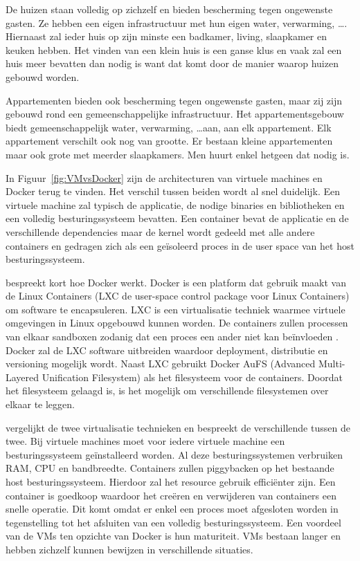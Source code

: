 De huizen staan volledig op zichzelf en bieden bescherming tegen ongewenste gasten.
Ze hebben een eigen infrastructuur met hun eigen water, verwarming, \ldots .
Hiernaast zal ieder huis op zijn minste een badkamer, living, slaapkamer en keuken hebben.
Het vinden van een klein huis is een ganse klus en vaak zal een huis meer bevatten dan nodig is want dat komt door de manier waarop huizen gebouwd worden.

Appartementen bieden ook bescherming tegen ongewenste gasten, maar zij zijn gebouwd rond een gemeenschappelijke infrastructuur.
Het appartementsgebouw biedt gemeenschappelijk water, verwarming, \ldots  aan, aan elk appartement.
Elk appartement verschilt ook nog van grootte.
Er bestaan kleine appartementen maar ook grote met meerder slaapkamers.
Men huurt enkel hetgeen dat nodig is.

In Figuur~\vref{fig:VMvsDocker} zijn de architecturen van virtuele machines en Docker terug te vinden.
Het verschil tussen beiden wordt al snel duidelijk.
Een virtuele machine zal typisch de applicatie, de nodige binaries en bibliotheken en een volledig besturingssysteem bevatten.
Een container bevat de applicatie en de verschillende dependencies maar de kernel wordt gedeeld met alle andere containers en gedragen zich als een geïsoleerd proces in de user space van het host besturingssysteem.

\citet{chamberlain2014using} bespreekt kort hoe Docker werkt.
Docker is een platform dat gebruik maakt van de Linux Containers (LXC de user-space control package voor Linux Containers) om software te encapsuleren.
LXC is een virtualisatie techniek waarmee virtuele omgevingen in Linux opgebouwd kunnen worden.
De containers zullen processen van elkaar sandboxen zodanig dat een proces een ander niet kan beïnvloeden \citep{merkel2014docker}.
Docker zal de LXC software uitbreiden waardoor deployment, distributie en versioning mogelijk wordt.
Naast LXC gebruikt Docker AuFS (Advanced Multi-Layered Unification Filesystem) als het filesysteem voor de containers.
Doordat het filesysteem gelaagd is, is het mogelijk om verschillende filesystemen over elkaar te leggen.

\citet{merkel2014docker} vergelijkt de twee virtualisatie technieken en bespreekt de verschillende tussen de twee.
Bij virtuele machines moet voor iedere virtuele machine een besturingssysteem geïnstalleerd worden.
Al deze besturingssystemen verbruiken RAM, CPU en bandbreedte.
Containers zullen piggybacken op het bestaande host besturingssysteem.
Hierdoor zal het resource gebruik efficiënter zijn.
Een container is goedkoop waardoor het creëren en verwijderen van containers een snelle operatie.
Dit komt omdat er enkel een proces moet afgesloten worden in tegenstelling tot het afsluiten van een volledig besturingssysteem.
Een voordeel van de VMs ten opzichte van Docker is hun maturiteit.
VMs bestaan langer en hebben zichzelf kunnen bewijzen in verschillende situaties.

